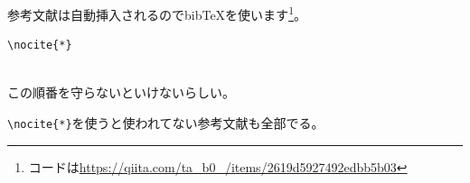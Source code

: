 \documentclass[xelatex,ja=standard,jafont=noto]{bxjsarticle}
\begin{document}
\newpage

参考文献は自動挿入されるのでbib\TeX を使います\footnote{コードは\url{https://qiita.com/ta_b0_/items/2619d5927492edbb5b03}}。
\begin{lstlisting}[caption=bib\TeX]
\nocite{*}


\end{lstlisting}
この順番を守らないといけないらしい。


\verb+\nocite{*}+を使うと使われてない参考文献も全部でる。

\nocite{*}


\end{document}
